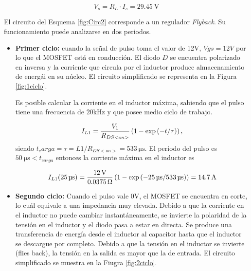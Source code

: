 \begin{equation}
	\boxed{V_s = R_L \cdot I_s = \SI{29,45}{\volt}}
\end{equation}





El circuito del Esquema \ref{fig:Circ2} corresponde a un regulador \textit{Flyback}. Su funcionamiento puede analizarse en dos periodos. 

\begin{itemize}
	\item \textbf{Primer ciclo:} cuando la señal de pulso toma el valor de 12V, $Vgs=12V$ por lo que el MOSFET está en conducción. El diodo $D$ se encuentra polarizado en inversa y la corriente que circula por el inductor produce almacenamiento de energái en su núcleo. El circuito simplificado se representa en la Figura \ref{fig:1ciclo}.

Es posible calcular la corriente en el inductor máxima, sabiendo que el pulso tiene una frecuencia de 20kHz y que posee medio ciclo de trabajo.

		\begin{equation}
			\centering
			I_{L1} = \frac{V_1}{R_{DS<on>}} \left(1-\exp{(-t/\tau)}\right),
		\end{equation}
		siendo $t_carga = \tau=L1/R_{DS<on>} = \SI{533}{\micro\second}$. El periodo del pulso es $\SI{50}{\micro\second} < t_{carga}$
entonces la corriente máxima en el inductor es

		\begin{equation}
			\centering
					I_{L1}(\SI{25}{\micro\second}) = \frac{\SI{12}{\volt}}{\SI{0.0375}{\ohm} } \left(1-\exp{(\SI{-25}{\micro\second}/ \SI{533}{\micro\second})}\right) = \SI{14.7}{\ampere}
		\end{equation}

	


\item \textbf{Segundo ciclo:}
	Cuando el pulso vale 0V, el MOSFET se encuentra en corte, lo cuál equivale a una impedancia muy elevada. Debido a que la corriente en el inductor no puede cambiar instantáneamente, se invierte la polaridad de la tensión en el inductor y el diodo pasa a estar en directa. Se produce una transferencia de energía desde el inductor al capacitor hasta que el inductor se descargue por completo. Debido a que la tensión en el inductor se invierte (flies back), la tensión en la salida es mayor que la de entrada. El circuito simplificado se muestra en la Fiugra \ref{fig:2ciclo}.


\end{itemize}

